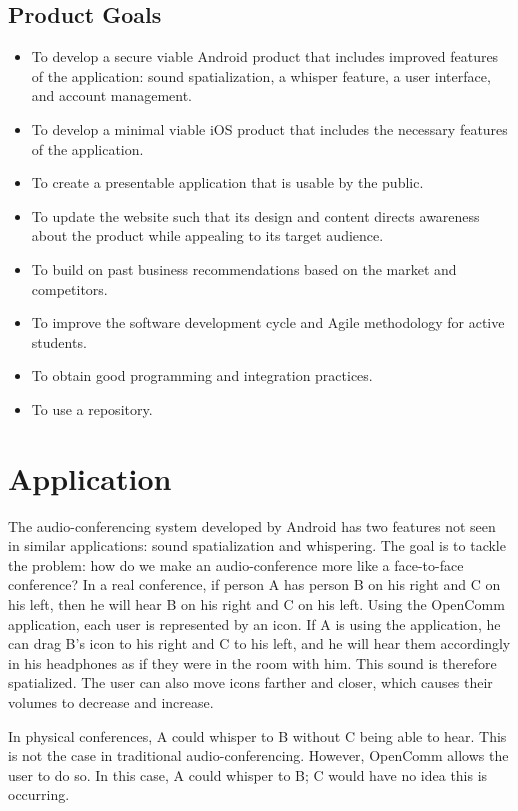 \documentclass[12pt, letterpaper]{article}
\begin{document}
\subsection{Product Goals}
\begin{itemize}
\item To develop a secure viable Android product that includes improved features of the application: sound spatialization, a whisper feature, a user interface, and account management.
\item To develop a minimal viable iOS product that includes the necessary features of the application.
\item To create a presentable application that is usable by the public.
\item To update the website such that its design and content directs awareness about the product while appealing to its target audience.
\item To build on past business recommendations based on the market and competitors.
\item To improve the software development cycle and Agile methodology for active students.
\item To obtain good programming and integration practices.
\item To use a repository.
\end{itemize}

\section{Application}
The audio-conferencing system developed by Android has two features not seen in similar applications: sound spatialization and whispering. The goal is to tackle the problem: how do we make an audio-conference more like a face-to-face conference? In a real conference, if person A has person B on his right and C on his left, then he will hear B on his right and C on his left. Using the OpenComm application, each user is represented by an icon. If A is using the application, he can drag B’s icon to his right and C to his left, and he will hear them accordingly in his headphones as if they were in the room with him. This sound is therefore spatialized. The user can also move icons farther and closer, which causes their volumes to decrease and increase.

In physical conferences, A could whisper to B without C being able to hear. This is not the case in traditional audio-conferencing. However, OpenComm allows the user to do so. In this case, A could whisper to B; C would have no idea this is occurring.
\end{document}
